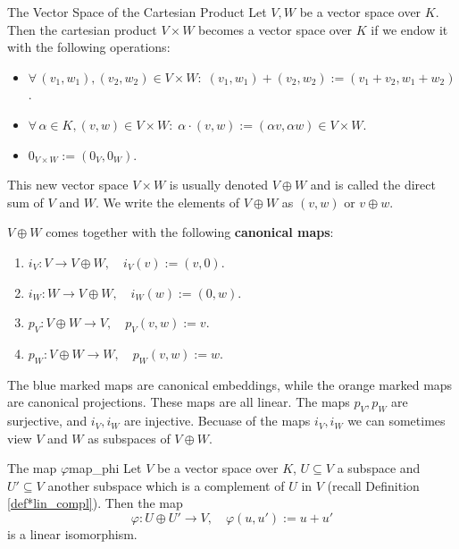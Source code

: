 \begin{proposition}{The Vector Space of the Cartesian Product}
	Let $V, W$ be a vector space over $K$. Then the cartesian product $V \times W$ becomes a vector space over $K$ if we endow it with the following operations:
	\begin{itemize}
		\item[$\bullet$] $\forall \, (v_1, w_1), (v_2, w_2) \in V \times W : \; (v_1, w_1) + (v_2, w_2) := (v_1+v_2, w_1+ w_2)$.
		\item[$\bullet$] $\forall \, \alpha \in K, (v,w) \in V \times W : \; \alpha \cdot (v,w) := (\alpha v, \alpha w) \in V \times W$.
		\item[$\bullet$] $0_{V \times W} := (0_V, 0_W)$.
	\end{itemize}
	This new vector space $V \times W$ is usually denoted $V \oplus W$ and is called the direct sum of $V$ and $W$. We write the elements of $V \oplus W$ as $(v,w)$ or $v \oplus w$.
\end{proposition}

\begin{remark}
	$V \oplus W$ comes together with the following \textbf{canonical maps}:
	\begin{enumerate}
		\item[\textcolor{blue}{1)}] $i_V:V \to V \oplus W, \quad i_V(v) := (v,0)$.
		\item[\textcolor{blue}{2)}] $i_W:W \to V \oplus W, \quad i_W(w) := (0,w)$.
		\item[\textcolor{orange}{3)}] $p_V:V \oplus W \to V, \quad p_V(v,w) := v$.
		\item[\textcolor{orange}{4)}] $p_W:V \oplus W \to W, \quad p_W(v,w) := w$.
	\end{enumerate}
	The blue marked maps are canonical embeddings, while the orange marked maps are canonical projections.
	These maps are all linear. The maps $p_V, p_W$ are surjective, and $i_V, i_W$ are injective. Becuase of the maps $i_V, i_W$ we can sometimes view $V$ and $W$ as subspaces of $V \oplus W$.
\end{remark}

\begin{proposition}{The map $\varphi$}{map_phi}
	Let $V$ be a vector space over $K$, $U \subseteq V$ a subspace and $U' \subseteq V$ another subspace which is a complement of $U$ in $V$ (recall Definition \ref{def*lin_compl}). Then the map
	\[
		\varphi: U \oplus U' \to V, \quad \varphi(u, u') := u + u'
	\]
	is a linear isomorphism.
\end{proposition}

